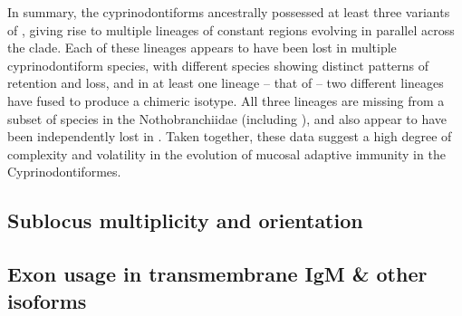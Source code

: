 In summary, the cyprinodontiforms ancestrally possessed at least three variants of , giving rise to multiple lineages of  constant regions evolving in parallel across the clade. Each of these lineages appears to have been lost in multiple cyprinodontiform species, with different species showing distinct patterns of retention and loss, and in at least one lineage -- that of  -- two different  lineages have fused to produce a chimeric isotype. All three lineages are missing from a subset of species in the Nothobranchiidae (including \nfu), and also appear to have been independently lost in . Taken together, these data suggest a high degree of complexity and volatility in the evolution of mucosal adaptive immunity in the Cyprinodontiformes.
	
	
	
	
	
	\subsection{Sublocus multiplicity and orientation}
	
	\subsection{Exon usage in transmembrane IgM \& other isoforms}



